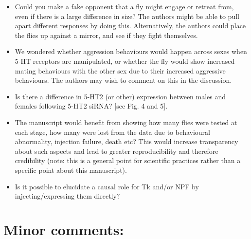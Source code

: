 \documentclass[10pt]{article}
\begin{document}
\begin{itemize}
\item
  Could you make a fake opponent that a fly might engage or retreat
  from, even if there is a large difference in size? The authors might
  be able to pull apart different responses by doing this.
  Alternatively, the authors could place the flies up against a mirror,
  and see if they fight themselves.
\item
  We wondered whether aggression behaviours would happen across sexes
  when 5-HT receptors are manipulated, or whether the fly would show
  increased mating behaviours with the other sex due to their increased
  aggressive behaviours. The authors may wish to comment on this in the
  discussion.
\item
  Is there a difference in 5-HT2 (or other) expression between males and
  females following 5-HT2 siRNA? {[}see Fig. 4 and 5{]}.
\item
  The manuscript would benefit from showing how many flies were tested
  at each stage, how many were lost from the data due to behavioural
  abnormality, injection failure, death etc? This would increase
  transparency about such aspects and lead to greater reproducibility
  and therefore credibility (note: this is a general point for
  scientific practices rather than a specific point about this
  manuscript).
\item
  Is it possible to elucidate a causal role for Tk and/or NPF by
  injecting/expressing them directly?
\end{itemize}

\subsection*{}

{\label{476186}}

\section*{Minor comments:}

{\label{323425}}
\end{document}

